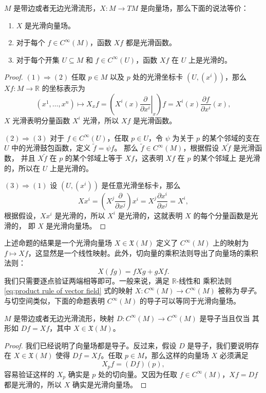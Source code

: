 \begin{proposition}
  $M$ 是带边或者无边光滑流形，$X:M\to TM$ 是向量场，那么下面的说法等价：
  \begin{enumerate}
    \item $X$ 是光滑向量场。
    \item 对于每个 $f\in C^\infty(M)$，函数 $Xf$ 都是光滑函数。
    \item 对于每个开集 $U\subseteq M$ 和 $f\in C^\infty(U)$，函数 $Xf$ 在 $U$ 上是光滑的。
  \end{enumerate}
\end{proposition}
\begin{proof}
  $(1)\Rightarrow (2)$ 任取 $p\in M$ 以及 $p$ 处的光滑坐标卡 $(U,(x^i))$，那么 
  $Xf:M\to \mathbb{R}$ 的坐标表示为
  \[
    \left(x^1,\dots,x^n \right)\mapsto 
    X_x f=\left(X^i(x)\left.\frac{\partial}{\partial x^i}\right|_x\right)f=
    X^i(x)\frac{\partial f}{\partial x^i}(x),
  \]
  $X$ 光滑表明分量函数 $X^i$ 光滑，所以 $Xf$ 是光滑函数。

  $(2)\Rightarrow (3)$ 对于 $f\in C^\infty(U)$，任取 $p\in U$，令 $\psi$
  为关于 $p$ 的某个邻域的支在 $U$ 中的光滑鼓包函数，定义 $\tilde f=\psi f$。
  那么 $\tilde f\in C^\infty(M)$，根据假设 $X\tilde f$ 是光滑函数，
  并且 $X\tilde f$ 在 $p$ 的某个邻域上等于 $Xf$，这表明 $Xf$ 在 $p$ 的某个邻域上
  是光滑的，所以在 $U$ 上是光滑的。

  $(3)\Rightarrow (1)$ 设 $(U,(x^i))$ 是任意光滑坐标卡，那么
  \[
    Xx^i=\left(X^j\frac{\partial }{\partial x^j}\right)x^i
    =X^j\frac{\partial x^i}{\partial x^j}=X^i,
  \]
  根据假设，$Xx^i$ 是光滑的，所以 $X^i$ 是光滑的，这就表明 $X$ 的每个分量函数是光滑的，
  即 $X$ 是光滑向量场。
\end{proof}

上述命题的结果是一个光滑向量场 $X\in \mathfrak X(M)$ 定义了 $C^\infty(M)$
上的映射为 $f\mapsto Xf$，这显然是一个线性映射。此外，切向量的乘积法则导出了向量场的乘积法则：
\begin{equation}\label{eq:product rule of vector field}
  X(fg)=fXg+gXf.
\end{equation}
我们只需要逐点验证两端相等即可。一般来说，满足 $\mathbb{R}$-线性和
乘积法则 \eqref{eq:product rule of vector field} 式的映射 $X:C^\infty(M)\to C^\infty(M)$
被称为\emph{导子}。与切空间类似，下面的命题表明 $C^\infty(M)$ 的导子可以等同于光滑向量场。

\begin{proposition}\label{prop:derivation and vector field}
  $M$ 是带边或者无边光滑流形，映射 $D:C^\infty(M)\to C^\infty(M)$ 是导子当且仅当
  其形如 $Df=Xf$，其中 $X\in \mathfrak X(M)$。
\end{proposition}
\begin{proof}
  我们已经说明了向量场都是导子。反过来，假设 $D$ 是导子，我们要说明存在 $X\in \mathfrak X(M)$
  使得 $Df=Xf$。任取 $p\in M$，那么这样的向量场 $X$ 必须满足
  \[
    X_pf=(Df)(p),
  \]
  容易验证这样的 $X_p$ 确实是 $p$ 处的切向量。又因为任取 $f\in C^\infty(M)$，$Xf=Df$
  都是光滑的，所以 $X$ 确实是光滑向量场。
\end{proof}

